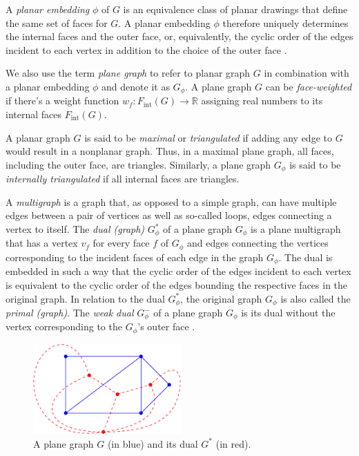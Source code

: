 A \emph{planar embedding} $\phi$ of $G$ is an equivalence class of planar drawings that define the same set of faces for $G$.
A planar embedding $\phi$ therefore uniquely determines the internal faces and the outer face, or, equivalently, the cyclic order of the edges incident to each vertex in addition to the choice of the outer face \cite{angelini2015monotone}.

We also use the term \emph{plane graph} to refer to planar graph $G$ in combination with a planar embedding $\phi$ and denote it as $G_\phi$.
A plane graph $G$ can be \emph{face-weighted} if there's a weight function $w_f \colon F_\text{int}(G) \to \mathbb{R}$ assigning real numbers to its internal faces $F_\text{int}(G)$.


A planar graph $G$ is said to be \emph{maximal} or \emph{triangulated} if adding any edge to $G$ would result in a nonplanar graph.
Thus, in a maximal plane graph, all faces, including the outer face, are triangles.
Similarly, a plane graph $G_\phi$ is said to be \emph{internally triangulated} if all internal faces are triangles.

A \emph{multigraph} is a graph that, as opposed to a simple graph, can have multiple edges between a pair of vertices as well as so-called loops, \ie{} edges connecting a vertex to itself.
The \emph{dual (graph)} $G_\phi^*$ of a plane graph $G_\phi$ is a plane multigraph that has a vertex $v_f$ for every face $f$ of $G_\phi$ and edges connecting the vertices corresponding to the incident faces of each edge in the graph $G_\phi$.
The dual is embedded in such a way that the cyclic order of the edges incident to each vertex is equivalent to the cyclic order of the edges bounding the respective faces in the original graph.
In relation to the dual $G_\phi^*$, the original graph $G_\phi$ is also called the \emph{primal (graph)}.
The \emph{weak dual} $G_\phi^-$ of a plane graph $G_\phi$ is its dual without the vertex corresponding to the $G_\phi$'s outer face \cite{fleischner1974}.

\begin{figure}[H]
	\centering\includegraphics[height=130px]{Resources/Preliminaries-Dual.pdf}
	\caption{A plane graph $G$ (in blue) and its dual $G^*$ (in red).}
	\label{fig:preliminaries-dual}
\end{figure}

